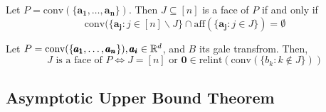 \begin{lemma}
    Let $P = \text{conv}(\{\pmb{a_1}, \dots, \pmb{a_n}\})$. Then $J \subseteq [n]$ is a face of $P$ if and only if
    $$\text{conv}(\{\pmb{a_j} : j \in [n] \backslash J \} \cap \text{aff}(\{\pmb{a_j} : j \in J \}) = \emptyset$$
\end{lemma}
\begin{theorem}
    Let $P = \text{conv}(\{\pmb{a_1}, \dots, \pmb{a_n}\}), \pmb{a_i} \in \mathbb{R}^{d}$, and $B$ its gale transfrom.
    Then,
    $$J \text{ is a face of } P \Leftrightarrow J = [n] \text{ or } \pmb{0} \in \text{relint}(\text{conv}(\{b_k : k \not\in J \}))$$
\end{theorem}

\subsection{Asymptotic Upper Bound Theorem}
